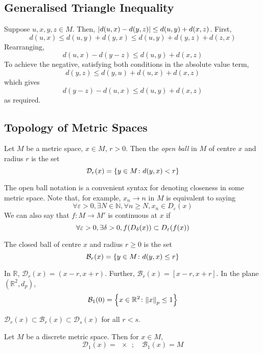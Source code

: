 \subsection{Generalised Triangle Inequality}
Suppose \( u,x,y,z \in M \).
Then, \( \abs{d(u,x) - d(y,z)} \leq d(u,y) + d(x,z) \).
First,
\[
	d(u,x) \leq d(u,y) + d(y,x) \leq d(u,y) + d(y,z) + d(z,x)
\]
Rearranging,
\[
	d(u,x)-d(y-z) \leq d(u,y) + d(x,z)
\]
To achieve the negative, satisfying both conditions in the absolute value term,
\[
	d(y,z) \leq d(y,u) + d(u,x) + d(x,z)
\]
which gives
\[
	d(y-z) - d(u,x) \leq d(u,y) + d(x,z)
\]
as required.

\subsection{Topology of Metric Spaces}
\begin{definition}
	Let \( M \) be a metric space, \( x \in M \), \( r > 0 \).
	Then the \textit{open ball} in \( M \) of centre \( x \) and radius \( r \) is the set
	\[
		\mathcal D_r(x) = \qty{y \in M \colon d(y,x) < r}
	\]
\end{definition}
The open ball notation is a convenient syntax for denoting closeness in some metric space.
Note that, for example, \( x_n \to n \) in \( M \) is equivalent to saying
\[
	\forall \varepsilon > 0, \exists N \in \mathbb N, \forall n \geq N, x_n \in D_\varepsilon(x)
\]
We can also say that \( f \colon M \to M' \) is continuous at \( x \) if
\[
	\forall \varepsilon > 0, \exists \delta > 0, f\qty(D_\delta(x)) \subset D_\varepsilon(f(x))
\]
\begin{definition}
	The closed ball of centre \( x \) and radius \( r \geq 0 \) is the set
	\[
		\mathcal B_r(x) = \qty{y \in M \colon d(y,x) \leq r}
	\]
\end{definition}
\begin{example}
	In \( \mathbb R \), \( \mathcal D_r(x) = (x-r,x+r) \).
	Further, \( \mathcal B_r(x) = [x-r,x+r] \).
	In the plane \( (\mathbb R^2, d_p) \),
	\[
		\mathcal B_1(0) = \qty{ x \in \mathbb R^2 \colon \norm{x}_p \leq 1 }
	\]
\end{example}
\begin{note}
	\( \mathcal D_r(x) \subset \mathcal B_r(x) \subset \mathcal D_s(x) \) for all \( r < s \).
\end{note}
\begin{example}
	Let \( M \) be a discrete metric space.
	Then for \( x \in M \),
	\[
		\mathcal D_1(x) = \qty{x};\quad \mathcal B_1(x) = M
	\]
\end{example}

